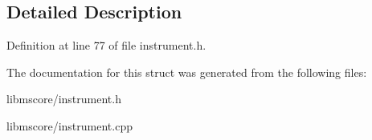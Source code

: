 \subsection{Detailed Description}


Definition at line 77 of file instrument.\+h.



The documentation for this struct was generated from the following files\+:\begin{DoxyCompactItemize}
\item 
libmscore/instrument.\+h\item 
libmscore/instrument.\+cpp\end{DoxyCompactItemize}
